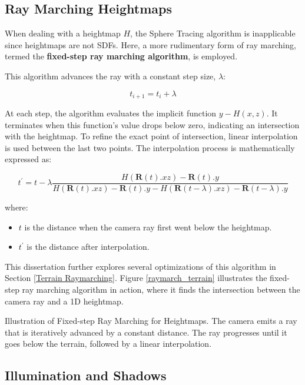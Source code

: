 \subsection{Ray Marching Heightmaps}
\label{Raymarching Heightmaps}

When dealing with a heightmap $H$, the Sphere Tracing algorithm is inapplicable since heightmaps are not SDFs. Here, a more rudimentary form of ray marching, termed the \textbf{fixed-step ray marching algorithm}, is employed.

This algorithm advances the ray with a constant step size, $\lambda$:

\begin{equation}
    t_{i+1} = t_{i} + \lambda
\end{equation}

At each step, the algorithm evaluates the implicit function $y-H(x,z)$. It terminates when this function's value drops below zero, indicating an intersection with the heightmap. To refine the exact point of intersection, linear interpolation is used between the last two points. The interpolation process is mathematically expressed as:

\begin{equation}
t^\prime = t - \lambda \frac{H(\mathbf{R}(t).xz) - \mathbf{R}(t).y}
    {H(\mathbf{R}(t).xz) - \mathbf{R}(t).y - H(\mathbf{R}(t - \lambda).xz) - \mathbf{R}(t - \lambda).y}
\end{equation}

where:
\begin{itemize}
    \item $t$ is the distance when the camera ray first went below the heightmap.
    \item $t^\prime$ is the distance after interpolation.
\end{itemize}

This dissertation further explores several optimizations of this algorithm in Section \ref{Terrain Raymarching}. Figure \ref{raymarch_terrain} illustrates the fixed-step ray marching algorithm in action, where it finds the intersection between the camera ray and a 1D heightmap.

{Illustration of Fixed-step Ray Marching for Heightmaps. The camera emits a ray that is iteratively advanced by a constant distance. The ray progresses until it goes below the terrain, followed by a linear interpolation.}


\subsection{Illumination and Shadows}

